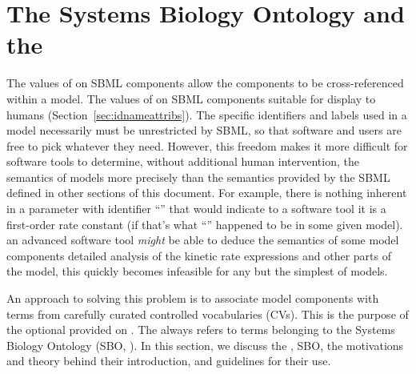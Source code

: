 
\section{The Systems Biology Ontology and the  }
\label{sec:sboTerm}
\label{sec:sbo}

The values of   on SBML components
allow the components to be cross-referenced within a model. The
values of   on SBML components
suitable for display to humans
(Section~\ref{sec:idnameattribs}).  The specific identifiers and
labels used in a model necessarily must be unrestricted by SBML,
so that software and users are free to pick whatever they need.
However, this freedom makes it more difficult for software tools
to determine, without additional human intervention, the semantics
of models more precisely than the semantics provided by the SBML
 defined in other sections of this document.  For
example, there is nothing inherent in a parameter with identifier
``'' that would indicate to a software tool it is a
first-order rate constant (if that's what ``'' happened
to be in some given model).  
   an advanced software
tool \emph{might} be able to deduce the semantics of some model
components  detailed analysis of the kinetic rate expressions
and other parts of the model, this quickly becomes infeasible for
any but the simplest of models.

An approach to solving this problem is to associate model
components with terms from carefully curated controlled
vocabularies (CVs).  This is the purpose of the optional
  provided on 
.  The   always refers to
terms belonging to the Systems Biology Ontology (SBO, \sboref). In
this section, we discuss the  ,
SBO, the motivations and theory behind their introduction, and
guidelines for their use.

